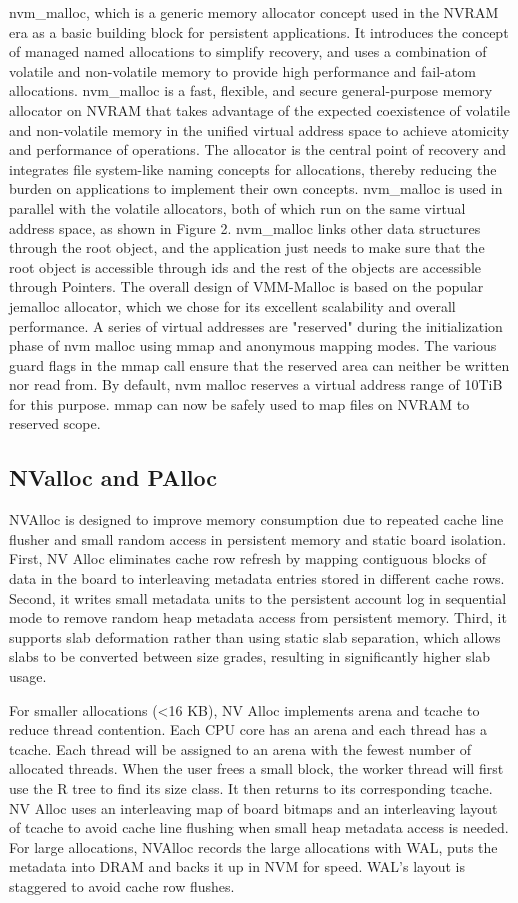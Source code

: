 \documentclass[sigconf]{acmart}
\begin{document}
nvm\_malloc, which is a generic memory allocator concept used in the NVRAM era as a basic building block for persistent applications. It introduces the concept of managed named allocations to simplify recovery, and uses a combination of volatile and non-volatile memory to provide high performance and fail-atom allocations. nvm\_malloc is a fast, flexible, and secure general-purpose memory allocator on NVRAM that takes advantage of the expected coexistence of volatile and non-volatile memory in the unified virtual address space to achieve atomicity and performance of operations. The allocator is the central point of recovery and integrates file system-like naming concepts for allocations, thereby reducing the burden on applications to implement their own concepts. nvm\_malloc is used in parallel with the volatile allocators, both of which run on the same virtual address space, as shown in Figure 2. nvm\_malloc links other data structures through the root object, and the application just needs to make sure that the root object is accessible through ids and the rest of the objects are accessible through Pointers. The overall design of VMM-Malloc is based on the popular jemalloc allocator, which we chose for its excellent scalability and overall performance. A series of virtual addresses are "reserved" during the initialization phase of nvm malloc using mmap and anonymous mapping modes. The various guard flags in the mmap call ensure that the reserved area can neither be written nor read from. By default, nvm malloc reserves a virtual address range of 10TiB for this purpose. mmap can now be safely used to map files on NVRAM to reserved scope.

\subsection{NValloc and PAlloc}
NVAlloc is designed to improve memory consumption due to repeated cache line flusher and small random access in persistent memory and static board isolation. First, NV Alloc eliminates cache row refresh by mapping contiguous blocks of data in the board to interleaving metadata entries stored in different cache rows. Second, it writes small metadata units to the persistent account log in sequential mode to remove random heap metadata access from persistent memory. Third, it supports slab deformation rather than using static slab separation, which allows slabs to be converted between size grades, resulting in significantly higher slab usage.

For smaller allocations (<16 KB), NV Alloc implements arena and tcache to reduce thread contention. Each CPU core has an arena and each thread has a tcache. Each thread will be assigned to an arena with the fewest number of allocated threads. When the user frees a small block, the worker thread will first use the R tree to find its size class. It then returns to its corresponding tcache. NV Alloc uses an interleaving map of board bitmaps and an interleaving layout of tcache to avoid cache line flushing when small heap metadata access is needed. For large allocations, NVAlloc records the large allocations with WAL, puts the metadata into DRAM and backs it up in NVM for speed. WAL's layout is staggered to avoid cache row flushes.
\end{document}

